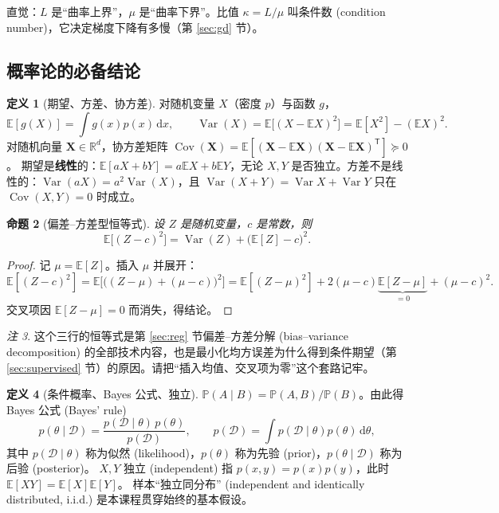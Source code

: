 \documentclass[UTF8,a4paper,11pt]{ctexart}
\theoremstyle{definition}
\newtheorem{definition}{定义}[section]
\theoremstyle{plain}
\newtheorem{proposition}[definition]{命题}
\theoremstyle{remark}
\newtheorem{remark}[definition]{注}
\DeclareMathOperator{\Var}{Var}
\DeclareMathOperator{\Cov}{Cov}
\newcommand{\R}{\mathbb{R}}
\newcommand{\E}{\mathbb{E}}
\newcommand{\Prob}{\mathbb{P}}
\newcommand{\D}{\mathcal{D}}
\newcommand{\dd}{\mathrm{d}}
\newcommand{\T}{^{\mathsf{T}}}
\newcommand{\eng}[1]{\textup{(#1)}}
\begin{document}
直觉：$L$ 是“曲率上界”，$\mu$ 是“曲率下界”。比值 $\kappa=L/\mu$ 叫条件数 \eng{condition number}，它决定梯度下降有多慢（第 \ref{sec:gd} 节）。

\subsection{概率论的必备结论}

\begin{definition}[期望、方差、协方差]
对随机变量 $X$（密度 $p$）与函数 $g$，
\[
  \E[g(X)]=\int g(x)p(x)\,\dd x,\qquad
  \Var(X)=\E\big[(X-\E X)^2\big]=\E[X^2]-(\E X)^2 .
\]
对随机向量 $\bm{X}\in\R^d$，协方差矩阵 $\Cov(\bm{X})=\E[(\bm{X}-\E\bm{X})(\bm{X}-\E\bm{X})\T]\succeq0$。
期望是\textbf{线性}的：$\E[aX+bY]=a\E X+b\E Y$，无论 $X,Y$ 是否独立。方差不是线性的：$\Var(aX)=a^2\Var(X)$，且 $\Var(X+Y)=\Var X+\Var Y$ 只在 $\Cov(X,Y)=0$ 时成立。
\end{definition}

\begin{proposition}[偏差--方差型恒等式]\label{prop:bv-identity}
设 $Z$ 是随机变量，$c$ 是常数，则
\[
  \E\big[(Z-c)^2\big]=\Var(Z)+\big(\E[Z]-c\big)^2 .
\]
\end{proposition}

\begin{proof}
记 $\mu=\E[Z]$。插入 $\mu$ 并展开：
\[
  \E[(Z-c)^2]=\E\big[\big((Z-\mu)+(\mu-c)\big)^2\big]
  =\E[(Z-\mu)^2]+2(\mu-c)\underbrace{\E[Z-\mu]}_{=0}+(\mu-c)^2 .
\]
交叉项因 $\E[Z-\mu]=0$ 而消失，得结论。
\end{proof}

\begin{remark}
这个三行的恒等式是第 \ref{sec:reg} 节偏差--方差分解 \eng{bias--variance decomposition} 的全部技术内容，也是最小化均方误差为什么得到条件期望（第 \ref{sec:supervised} 节）的原因。请把“插入均值、交叉项为零”这个套路记牢。
\end{remark}

\begin{definition}[条件概率、Bayes 公式、独立]
$\Prob(A\mid B)=\Prob(A,B)/\Prob(B)$。由此得 Bayes 公式 \eng{Bayes' rule}
\[
  p(\theta\mid \D)=\frac{p(\D\mid\theta)\,p(\theta)}{p(\D)},\qquad p(\D)=\int p(\D\mid\theta)p(\theta)\,\dd\theta,
\]
其中 $p(\D\mid\theta)$ 称为似然 \eng{likelihood}，$p(\theta)$ 称为先验 \eng{prior}，$p(\theta\mid\D)$ 称为后验 \eng{posterior}。
$X,Y$ 独立 \eng{independent} 指 $p(x,y)=p(x)p(y)$，此时 $\E[XY]=\E[X]\E[Y]$。
样本“独立同分布” \eng{independent and identically distributed, i.i.d.} 是本课程贯穿始终的基本假设。
\end{definition}
\end{document}
